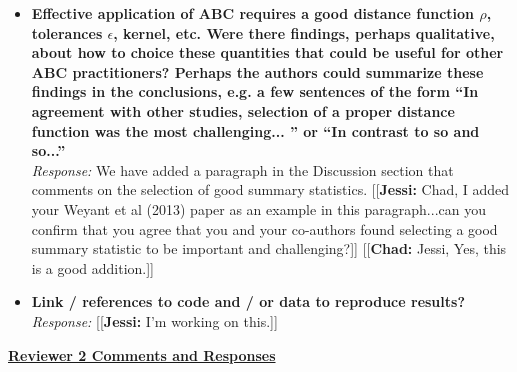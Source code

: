 \documentclass[11pt, oneside]{article}   	%
\newcommand{\jessi}[1]{{\color{blue}[[\textbf{Jessi: }#1]]}}
\newcommand{\chad}[1]{{\color{cyan}[[\textbf{Chad: }#1]]}}
\begin{document}
\begin{itemize}
\item {\bf Effective application of ABC requires a good distance function $\rho$, tolerances $\epsilon$, kernel, etc. Were there findings, perhaps qualitative, about how to choice these quantities that could be useful for other ABC practitioners? Perhaps the authors could summarize these findings in the conclusions, e.g. a few sentences of the form ``In agreement with other studies, selection of a proper distance function was the most challenging... '' or ``In contrast to so and so...'' }\\
\noindent \emph{Response:} We have added a paragraph in the Discussion section that comments on the selection of good summary statistics.
\jessi{Chad, I added your Weyant et al (2013) paper as an example in this paragraph...can you confirm that you agree that you and your co-authors found selecting a good summary statistic to be important and challenging?}
\chad{Jessi, Yes, this is a good addition.}
\bigskip

\item {\bf Link / references to code and / or data to reproduce results?} \\
\noindent \emph{Response:} \jessi{I'm working on this.}
\bigskip
\end{itemize}



\noindent \underline{\bf Reviewer 2 Comments and Responses}
\end{document}
